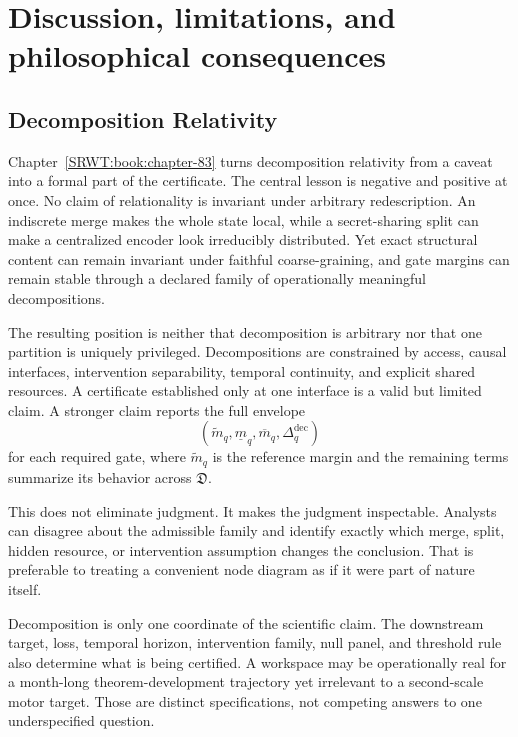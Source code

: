 
\chapter{Discussion, limitations, and philosophical consequences}\label{SRWT:book:chapter-92}


\section{Decomposition Relativity}

Chapter~\ref{SRWT:book:chapter-83} turns decomposition relativity from a caveat into a formal part of the
certificate. The central lesson is negative and positive at once. No claim of
relationality is invariant under arbitrary redescription. An indiscrete merge
makes the whole state local, while a secret-sharing split can make a centralized
encoder look irreducibly distributed. Yet exact structural content can remain
invariant under faithful coarse-graining, and gate margins can remain stable
through a declared family of operationally meaningful decompositions.

The resulting position is neither that decomposition is arbitrary nor that one
partition is uniquely privileged. Decompositions are constrained by access,
causal interfaces, intervention separability, temporal continuity, and explicit
shared resources. A certificate established only at one interface is a valid
but limited claim. A stronger claim reports the full envelope
\[
\left(
\widetilde m_q,
\underline m_q,
\overline m_q,
\Delta_q^{\mathrm{dec}}
\right)
\]
for each required gate, where \(\tilde m_q\) is the reference margin and the
remaining terms summarize its behavior across \(\mathfrak D\).

This does not eliminate judgment. It makes the judgment inspectable. Analysts
can disagree about the admissible family and identify exactly which merge,
split, hidden resource, or intervention assumption changes the conclusion.
That is preferable to treating a convenient node diagram as if it were part of
nature itself.


Decomposition is only one coordinate of the scientific claim. The downstream
target, loss, temporal horizon, intervention family, null panel, and threshold
rule also determine what is being certified. A workspace may be operationally
real for a month-long theorem-development trajectory yet irrelevant to a
second-scale motor target. Those are distinct specifications, not competing
answers to one underspecified question.

